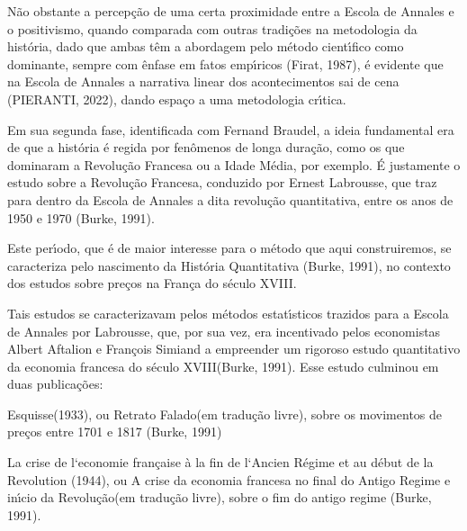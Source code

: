 \documentclass[
12pt,		%
openright,	%
twoside,  %
a4paper,			%
chapter=TITLE,		%
english,			%
french,				%
spanish,			%
brazil				%
]{USPSC-classe/USPSC}
\begin{document}
N\~ao obstante a percep\c{c}\~ao de uma certa proximidade entre a Escola de Annales e o positivismo, quando comparada com outras tradi\c{c}\~oes na metodologia da hist\'oria, dado que ambas t\^em a abordagem pelo m\'etodo cient\'{\i}fico como dominante, sempre com \^enfase em fatos emp\'{\i}ricos (Firat, 1987), \'e evidente que na Escola de Annales a narrativa linear dos acontecimentos sai de cena (PIERANTI, 2022), dando espa\c{c}o a uma metodologia cr\'{\i}tica.




Em sua segunda fase, identificada com Fernand Braudel, a ideia fundamental era de que a hist\'oria \'e regida por fen\^omenos de longa dura\c{c}\~ao, como os que dominaram a Revolu\c{c}\~ao Francesa ou a Idade M\'edia, por exemplo. \'E justamente o estudo sobre a Revolu\c{c}\~ao Francesa, conduzido por Ernest Labrousse, que traz para dentro da Escola de Annales a dita \textquotedbl revolu\c{c}\~ao quantitativa\textquotedbl , entre os anos de 1950 e 1970  (Burke, 1991).




Este per\'{\i}odo, que \'e de maior interesse para o m\'etodo que aqui construiremos, se caracteriza pelo nascimento da Hist\'oria Quantitativa (Burke, 1991), no contexto dos estudos sobre pre\c{c}os na Fran\c{c}a do s\'eculo XVIII.




Tais estudos se caracterizavam pelos m\'etodos estat\'{\i}sticos trazidos para a Escola de Annales por Labrousse, que, por sua vez, era \textquotedbl incentivado pelos economistas Albert Aftalion e Fran\c{c}ois Simiand a empreender um rigoroso estudo quantitativo da economia francesa do s\'eculo XVIII\textquotedbl   (Burke, 1991). Esse estudo culminou em duas publica\c{c}\~oes:





\begin{alineas}
\item \textquotedbl Esquisse\textquotedbl  (1933), ou \textquotedbl Retrato Falado\textquotedbl  (em tradu\c{c}\~ao livre), sobre os movimentos de pre\c{c}os entre 1701 e 1817  (Burke, 1991)
\item La crise de l`economie fran\c{c}aise \`a la fin de l`Ancien R\'egime et au d\'ebut de la Revolution (1944), ou \textquotedbl A crise da economia francesa no final do Antigo Regime e in\'{\i}cio da Revolu\c{c}\~ao\textquotedbl  (em tradu\c{c}\~ao livre), sobre o fim do antigo regime  (Burke, 1991).

\end{alineas}
\end{document}
